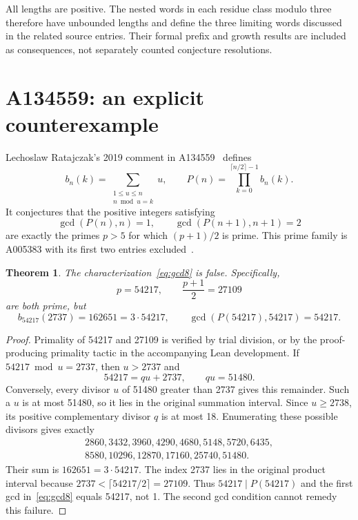 \documentclass[11pt]{article}
\newtheorem{theorem}{Theorem}[section]
\begin{document}
All lengths are positive. The nested words in each residue class modulo
three therefore have unbounded lengths and define the three limiting
words discussed in the related source entries. Their formal prefix and
growth results are included as consequences, not separately counted
conjecture resolutions.

\section{A134559: an explicit counterexample}

Lechoslaw Ratajczak's 2019 comment in A134559~\cite{A134559} defines
\[
b_n(k)=\sum_{\substack{1\leq u\leq n\\n\bmod u=k}}u,
\qquad
P(n)=\prod_{k=0}^{\lceil n/2\rceil-1}b_n(k).
\]
It conjectures that the positive integers satisfying
\begin{equation}\label{eq:gcd8}
\gcd(P(n),n)=1,\qquad \gcd(P(n+1),n+1)=2
\end{equation}
are exactly the primes $p>5$ for which $(p+1)/2$ is prime. This prime
family is A005383 with its first two entries excluded~\cite{A005383}.

\begin{theorem}\label{thm:counter8}
The characterization~\eqref{eq:gcd8} is false. Specifically,
\[
p=54217,\qquad \frac{p+1}{2}=27109
\]
are both prime, but
\[
b_{54217}(2737)=162651=3\cdot54217,
\qquad \gcd(P(54217),54217)=54217.
\]
\end{theorem}
\begin{proof}
Primality of 54217 and 27109 is verified by trial division, or by the
proof-producing primality tactic in the accompanying Lean development.
If $54217\bmod u=2737$, then $u>2737$ and
\[
54217=qu+2737,\qquad qu=51480.
\]
Conversely, every divisor $u$ of 51480 greater than 2737 gives this
remainder. Such a $u$ is at most 51480, so it lies in the original
summation interval. Since $u\geq2738$, its positive complementary divisor
$q$ is at most 18. Enumerating these possible divisors gives exactly
\[
\begin{gathered}
2860,3432,3960,4290,4680,5148,5720,6435,\\
8580,10296,12870,17160,25740,51480.
\end{gathered}
\]
Their sum is $162651=3\cdot54217$. The index 2737 lies in the original
product interval because $2737<\lceil54217/2\rceil=27109$. Thus
$54217\mid P(54217)$ and the first gcd in~\eqref{eq:gcd8} equals
54217, not 1. The second gcd condition cannot remedy this failure.
\end{proof}
\end{document}
